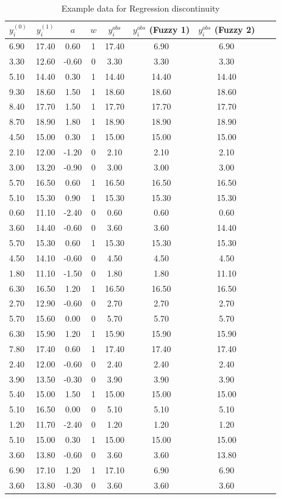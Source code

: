 \begin{table}[htbp]\centering
\caption{Example data for Regression discontinuity\label{tab:rddata}
\textbf{} }\begin{tabular} {@{} l c c c c c c c c @{}} \\
$y_i^{\left(0\right)}$ & $y_i^{\left(1\right)}$ & $a$ & $w$ & $y_i^{obs}$ & $y_i^{obs}$ (Fuzzy 1) & $y_i^{obs}$ (Fuzzy 2) \\
\hline
6.90&17.40&0.60&1&17.40&6.90&6.90 \\
3.30&12.60&-0.60&0&3.30&3.30&3.30 \\
5.10&14.40&0.30&1&14.40&14.40&14.40 \\
9.30&18.60&1.50&1&18.60&18.60&18.60 \\
8.40&17.70&1.50&1&17.70&17.70&17.70 \\
8.70&18.90&1.80&1&18.90&18.90&18.90 \\
4.50&15.00&0.30&1&15.00&15.00&15.00 \\
2.10&12.00&-1.20&0&2.10&2.10&2.10 \\
3.00&13.20&-0.90&0&3.00&3.00&3.00 \\
5.70&16.50&0.60&1&16.50&16.50&16.50 \\
5.10&15.30&0.90&1&15.30&15.30&15.30 \\
0.60&11.10&-2.40&0&0.60&0.60&0.60 \\
3.60&14.40&-0.60&0&3.60&3.60&14.40 \\
5.70&15.30&0.60&1&15.30&15.30&15.30 \\
4.50&14.10&-0.60&0&4.50&4.50&4.50 \\
1.80&11.10&-1.50&0&1.80&1.80&11.10 \\
6.30&16.50&1.20&1&16.50&16.50&16.50 \\
2.70&12.90&-0.60&0&2.70&2.70&2.70 \\
5.70&15.60&0.00&0&5.70&5.70&5.70 \\
6.30&15.90&1.20&1&15.90&15.90&15.90 \\
7.80&17.40&0.60&1&17.40&17.40&17.40 \\
2.40&12.00&-0.60&0&2.40&2.40&2.40 \\
3.90&13.50&-0.30&0&3.90&3.90&3.90 \\
5.40&15.00&1.50&1&15.00&15.00&15.00 \\
5.10&16.50&0.00&0&5.10&5.10&5.10 \\
1.20&11.70&-2.40&0&1.20&1.20&1.20 \\
5.10&15.00&0.30&1&15.00&15.00&15.00 \\
3.60&13.80&-0.60&0&3.60&3.60&13.80 \\
6.90&17.10&1.20&1&17.10&6.90&6.90 \\
3.60&13.80&-0.30&0&3.60&3.60&3.60 \\

\hline
\end{tabular}
\end{table}



